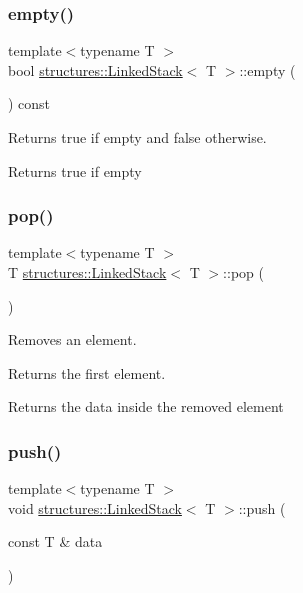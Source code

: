 \subsubsection{\texorpdfstring{empty()}{empty()}}
{\footnotesize\ttfamily template$<$typename T $>$ \\
bool \mbox{\hyperlink{classstructures_1_1LinkedStack}{structures\+::\+Linked\+Stack}}$<$ T $>$\+::empty (\begin{DoxyParamCaption}{ }\end{DoxyParamCaption}) const}



Returns true if empty and false otherwise. 

\begin{DoxyReturn}{Returns}
true if empty 
\end{DoxyReturn}
\mbox{\label{classstructures_1_1LinkedStack_a8ff0ba0de594ec26971bb259e1d28c3c}} 
\subsubsection{\texorpdfstring{pop()}{pop()}}
{\footnotesize\ttfamily template$<$typename T $>$ \\
T \mbox{\hyperlink{classstructures_1_1LinkedStack}{structures\+::\+Linked\+Stack}}$<$ T $>$\+::pop (\begin{DoxyParamCaption}{ }\end{DoxyParamCaption})}



Removes an element. 

Returns the first element.

\begin{DoxyReturn}{Returns}
the data inside the removed element 
\end{DoxyReturn}
\mbox{\label{classstructures_1_1LinkedStack_adb8c6b231298ac25b17ba692d510a3fc}} 
\subsubsection{\texorpdfstring{push()}{push()}}
{\footnotesize\ttfamily template$<$typename T $>$ \\
void \mbox{\hyperlink{classstructures_1_1LinkedStack}{structures\+::\+Linked\+Stack}}$<$ T $>$\+::push (\begin{DoxyParamCaption}\item[{const T \&}]{data }\end{DoxyParamCaption})}



